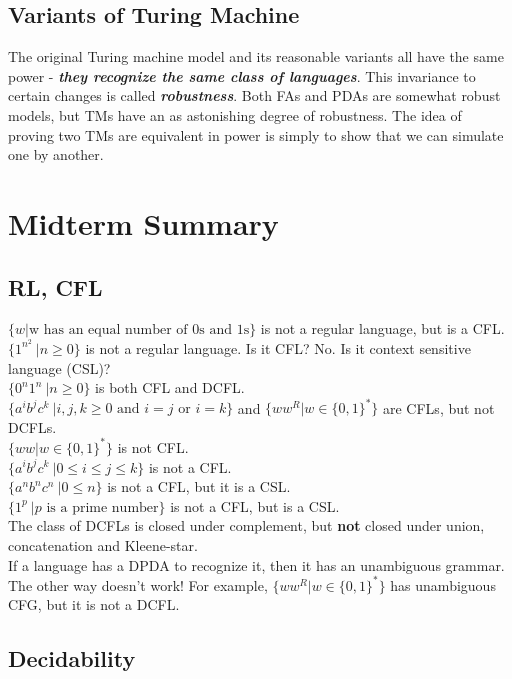 \documentclass[11pt]{article}
\newcommand{\bemph}[1]{{\bfseries\itshape#1}}
\begin{document}
\subsection{Variants of Turing Machine}

The original Turing machine model and its reasonable variants all have
the same power - \bemph{they recognize the same class of
  languages}. This invariance to certain changes is called
\bemph{robustness}. Both FAs and PDAs are somewhat robust models, but
TMs have an as astonishing degree of robustness. The idea of proving
two TMs are equivalent in power is simply to show that we can simulate
one by another.

\section{Midterm Summary}
\subsection{RL, CFL}
$\{w|\text{w has an equal number of 0s and 1s}\}$ is not a regular
language, but is a CFL.\\
$\{1^{n^2}\ | n \geq 0\}$ is not a regular language. Is it CFL? No. Is
it context sensitive language (CSL)?\\
$\{0^n1^n\ | n \geq 0\}$ is both CFL and DCFL.\\
$\{a^ib^jc^k\ | i,j,k \geq 0 \text{ and }i=j \text{ or } i=k
\}$ and $\{ww^R | w \in \{0,1\}^*\}$ are CFLs, but not DCFLs. \\
$\{ww | w \in \{0,1\}^*\}$ is not CFL. \\
$\{a^ib^jc^k\ | 0 \leq i \leq j \leq k\}$ is not a CFL. \\
$\{a^nb^nc^n\ | 0 \leq n\}$ is not a CFL, but it is a CSL. \\
$\{1^{p}\ | p \text{ is a prime number}\}$ is not a CFL, but is a CSL.\\

The class of DCFLs is closed under complement, but \textbf{not} closed
under union, concatenation and Kleene-star.\\
If a language has a DPDA to recognize it, then it has an unambiguous
grammar. \\
The other way doesn't work! For example, $\{ww^R | w \in \{0,1\}^*\}$
has unambiguous CFG, but it is not a DCFL.

\subsection{Decidability}
\end{document}

